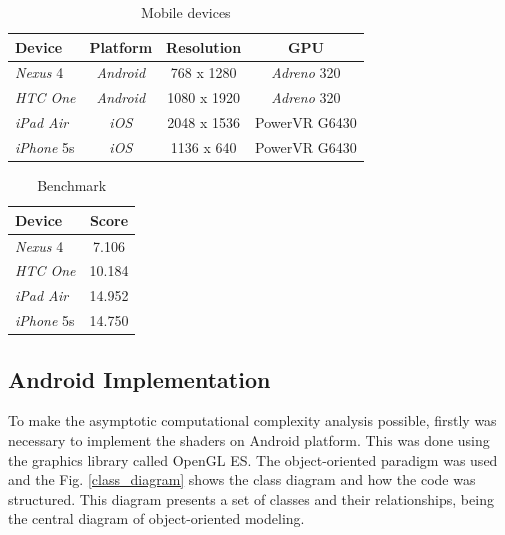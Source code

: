 \documentclass[10pt, conference, compsocconf]{IEEEtran}
\begin{document}
{\begin{table}[!t]
	\centering
	\caption{Mobile devices}
	\begin{tabular}{lccc}
	\hline
		\textbf{Device} & \textbf{Platform}  & \textbf{Resolution} & \textbf{GPU}  \\
	\hline	
		\textit{Nexus} 4 &  \textit{Android} & 768 x 1280 &  \textit{Adreno} 320 \\
		
		\textit{HTC One} &  \textit{Android} & 1080 x 1920 &  \textit{Adreno} 320 \\ 
		\textit{iPad Air} &  \textit{iOS} & 2048 x 1536  &  PowerVR G6430 \\
		
	\textit{iPhone} 5s &  \textit{iOS} & 1136 x 640  &  PowerVR G6430 \\
	\hline
	\end{tabular}
	\label{equipamentos}
\end{table}


\begin{table}[!t]
	\centering
	\caption{Benchmark}
	\begin{tabular}{lc}
	\hline
		\textbf{Device} & \textbf{Score} \\
	\hline
		\textit{Nexus} 4 & 7.106\\
		\textit{HTC One} & 10.184\\ 
		\textit{iPad Air} & 14.952\\
		\textit{iPhone} 5s & 14.750\\
	\hline
	\end{tabular}
	\label{bench}
\end{table}

\subsection{Android Implementation}
\label{sec:android}

To make the asymptotic computational complexity analysis possible, firstly
was necessary to implement the shaders on Android platform. This was done
using the graphics library called OpenGL ES. The object-oriented paradigm was 
used and the Fig. \ref{class_diagram} shows the class diagram and how the code was structured. 
This diagram presents a set of classes and their relationships, being the central diagram
of object-oriented modeling.


}
\end{document}
